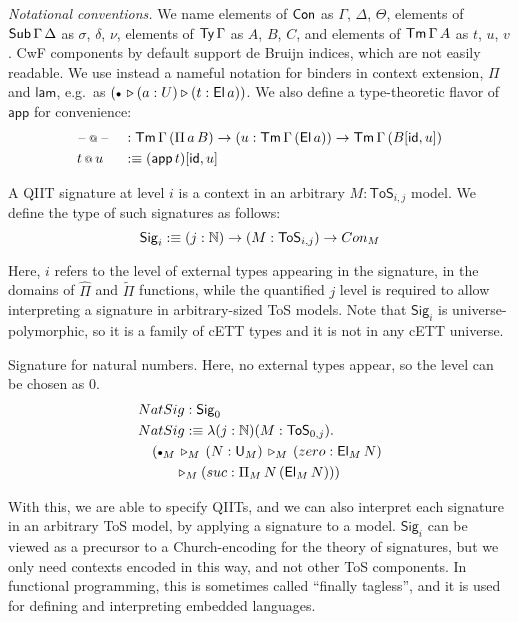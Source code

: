 \documentclass[sigplan,review,anonymous]{acmart}\settopmatter{printfolios=true,printccs=false,printacmref=false}
\makeatletter
\newcommand{\ToS}{\mathsf{ToS}}
\newcommand{\ext}{\triangleright}
\newcommand{\emptycon}{\scaleobj{.75}\bullet}
\newcommand{\Pii}{\Pi}
\newcommand{\appi}{\mathsf{app}}
\newcommand{\lami}{\mathsf{lam}}
\newcommand{\Pie}{\hat{\Pi}}
\newcommand{\Piinf}{\tilde{\Pi}}
\newcommand{\appitt}{\mathop{{\scriptstyle @}}}
\newcommand{\Sig}{\mathsf{Sig}}
\makeatother
\begin{document}
\emph{Notational conventions.} We name elements of $\mathsf{Con}$ as $\Gamma$, $\Delta$,
$\Theta$, elements of $\mathsf{Sub}\,\Gamma\,\Delta$ as $\sigma$, $\delta$, $\nu$,
elements of $\mathsf{Ty}\,\Gamma$ as $A$, $B$, $C$, and elements of $\mathsf{Tm}\,\Gamma\,A$ as
$t$, $u$, $v$. CwF components by default support de Bruijn indices, which are
not easily readable. We use instead a nameful notation for binders in context
extension, $\Pii$ and $\lami$, e.g.\ as $(\emptycon\,\ext (a : U) \ext (t :
\El\,a))$. We also define a type-theoretic flavor of $\appi$ for convenience:
\begin{alignat*}{3}
  & \blank\appitt\blank && :
      \Tm\,\Gamma\,(\Pii\,a\,B)\ra
      (u : \Tm\,\Gamma\,(\El\,a)) \ra \Tm\,\Gamma\,(B[\id, u])\\
  & t\appitt u && :\equiv (\appi\,t)[\id, u]
\end{alignat*}

\begin{definition}
A QIIT signature at level $i$ is a context in an arbitrary $M : \ToS_{i,j}$
model. We define the type of such signatures as follows:
\[
  \Sig_i :\equiv (j : \mathbb{N})\ra(M : \ToS_{i,j})\ra Con_M
\]

Here, $i$ refers to the level of external types appearing in the signature, in
the domains of $\Pie$ and $\Piinf$ functions, while the quantified $j$ level is
required to allow interpreting a signature in arbitrary-sized ToS models. Note
that $\Sig_i$ is universe-polymorphic, so it is a family of cETT types and it is
not in any cETT universe.

\begin{example}{
    Signature for natural numbers. Here, no external types appear, so the level
    can be chosen as $0$.}
\begin{alignat*}{3}
  & NatSig : \Sig_0 \\
  & NatSig :\equiv \lambda (j :\mathbb{N})(M : \ToS_{0,j}).\\
  & \hspace{1em}(\emptycon_M\,\ext_M\, (N : \U_M) \,\ext_M\,(zero : \El_M\,N)\\
  & \hspace{2.67em}\ext_M (suc : \Pii_M\,N\,(\El_M\,N)))
\end{alignat*}
\end{example}

With this, we are able to specify QIITs, and we can also interpret each
signature in an arbitrary ToS model, by applying a signature to a model.
$\Sig_i$ can be viewed as a precursor to a Church-encoding for the theory of
signatures, but we only need contexts encoded in this way, and not other ToS
components. In functional programming, this is sometimes called
``finally tagless''\cite{carette2007finally}, and it is used for defining and
interpreting embedded languages.
\end{definition}
\end{document}
